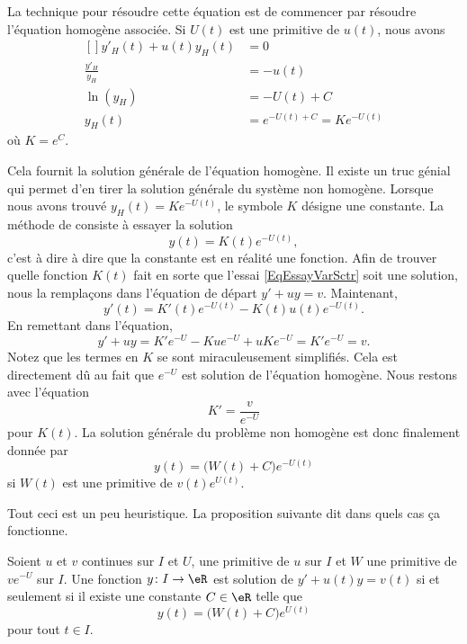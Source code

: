 La technique pour résoudre cette équation est de commencer par résoudre l'équation homogène associée. Si $U(t)$ est une primitive de $u(t)$, nous avons
\begin{equation}
	\begin{aligned}[]
		y'_H(t)+u(t)y_H(t)&=0\\
		\frac{ y'_H }{ y_H }&=-u(t)\\
		\ln(y_H)&=-U(t)+C\\
		y_H(t)&= e^{-U(t)+C}=K e^{-U(t)}
	\end{aligned}
\end{equation}
où $K= e^{C}$.

Cela fournit la solution générale de l'équation homogène. Il existe un truc génial qui permet d'en tirer la solution générale du système non homogène. Lorsque nous avons trouvé $y_H(t)=K e^{-U(t)}$, le symbole $K$ désigne une constante. La méthode de  consiste à essayer la solution
\begin{equation}		\label{EqEssayVarSctr}
	y(t)=K(t) e^{-U(t)},
\end{equation}
c'est à dire à dire que la constante est en réalité une fonction. Afin de trouver quelle fonction $K(t)$ fait en sorte que l'essai \eqref{EqEssayVarSctr} soit une solution, nous la remplaçons dans l'équation de départ $y'+uy=v$. Maintenant,
\begin{equation}
	y'(t)=K'(t) e^{-U(t)}-K(t)u(t) e^{-U(t)}.
\end{equation}
En remettant dans l'équation,
\begin{equation}
	y'+uy=K' e^{-U}-Ku e^{-U}+uK e^{-U}=K' e^{-U}=v.
\end{equation}
Notez que les termes en $K$ se sont miraculeusement simplifiés. Cela est directement dû au fait que $ e^{-U}$ est solution de l'équation homogène. Nous restons avec l'équation
\begin{equation}
	K'=\frac{ v }{  e^{-U} }
\end{equation}
pour $K(t)$. La solution générale du problème non homogène est donc finalement donnée par
\begin{equation}
	y(t)=\big( W(t)+C \big) e^{-U(t)}
\end{equation}
si $W(t)$ est une primitive de $v(t)e^{U(t)}$.

Tout ceci est un peu heuristique. La proposition suivante dit dans quels cas ça fonctionne.
\begin{proposition}
Soient $u$ et $v$ continues sur $I$ et $U$, une primitive de $u$ sur $I$ et $W$ une primitive de $v e^{-U}$ sur $I$. Une fonction $y\colon I\to \eR$ est solution de $y'+u(t)y=v(t)$ si et seulement si il existe une constante $C\in \eR$ telle que
\begin{equation}
	y(t)=\big( W(t)+C \big) e^{U(t)}
\end{equation}
pour tout $t\in I$.
\end{proposition}

